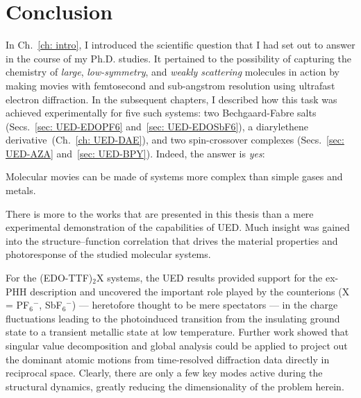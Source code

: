
\chapter{Conclusion}
\label{ch: conclusion}

In Ch.~\ref{ch: intro}, I introduced the scientific question that
I had set out to answer in the course of my Ph.D. studies.
%
It pertained to the possibility of capturing the chemistry of \emph{large},
\emph{low-symmetry}, and \emph{weakly scattering} molecules in action
by making movies with femtosecond and sub-angstrom resolution
using ultrafast electron diffraction.
%
In the subsequent chapters, I described how this task was achieved experimentally
for five such systems: two Bechgaard-Fabre salts (Secs.~\ref{sec: UED-EDOPF6}
and~\ref{sec: UED-EDOSbF6}), a diarylethene derivative~(Ch.~\ref{ch: UED-DAE}),
and two spin-crossover complexes (Secs.~\ref{sec: UED-AZA} and~\ref{sec: UED-BPY}).
%
Indeed, the answer is \emph{yes}:
%
\vspace{0.5\baselineskip}
%
\begin{center}
  \begin{minipage}{0.8\textwidth}
    Molecular movies can be made of systems more complex than simple gases and metals.
  \end{minipage}
\end{center}

\vspace{0.5\baselineskip}

There is more to the works that are presented in this thesis than a mere experimental
demonstration of the capabilities of UED.
%
Much insight was gained into the structure--function correlation
that drives the material properties and photoresponse of the studied molecular systems.

For the (EDO-TTF)$_2$X systems, the UED results provided support
for the {ex-PHH} description and uncovered the important role played by the counterions
(X = {PF$_6$}$^-$, {SbF$_6$}$^-$) --- heretofore thought to be mere spectators ---
in the charge fluctuations leading to the photoinduced transition
from the insulating ground state to a transient metallic state at low temperature.
%
Further work showed that singular value decomposition and global analysis
could be applied to project out the dominant atomic motions
from time-resolved diffraction data directly in reciprocal space.
Clearly, there are only a few key modes active during the structural dynamics,
greatly reducing the dimensionality of the problem herein.

